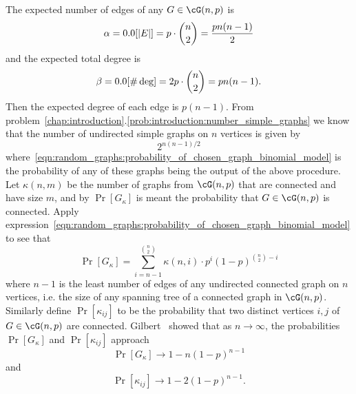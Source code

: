 The expected number of edges of any $G \in \cG(n,p)$ is
\[
\alpha
=
\E[|E|]
=
p \cdot \binom{n}{2}
=
\frac{pn(n - 1)} {2}
\]
and the expected total degree is
\[
\beta
=
\E[\#\deg]
=
2p \cdot \binom{n}{2}
=
pn(n - 1).
\]
Then the expected degree of each edge is $p(n - 1)$. From
problem~\ref{chap:introduction}.\ref{prob:introduction:number_simple_graphs}
we know that the number of undirected simple graphs on $n$ vertices is
given by
\[
2^{n(n-1) / 2}
\]
where~\eqref{eqn:random_graphs:probability_of_chosen_graph_binomial_model}
is the probability of any of these graphs being the output of the
above procedure. Let $\kappa(n,m)$ be the number of graphs from
$\cG(n,p)$ that are connected and have size $m$, and by $\Pr[G_\kappa]$
is meant the probability that $G \in \cG(n,p)$ is connected. Apply
expression~\eqref{eqn:random_graphs:probability_of_chosen_graph_binomial_model}
to see that
\[
\Pr[G_\kappa]
=
\sum_{i=n-1}^{\binom{n}{2}}
\kappa(n,i) \cdot p^i (1 - p)^{\binom{n}{2} - i}
\]
where $n - 1$ is the least number of edges of any undirected connected
graph on $n$ vertices, i.e. the size of any spanning tree of a
connected graph in $\cG(n,p)$. Similarly define $\Pr[\kappa_{ij}]$ to
be the probability that two distinct vertices $i,j$ of
$G \in \cG(n,p)$ are connected. Gilbert~\cite{Gilbert1959} showed that
as $n \to \infty$, the probabilities $\Pr[G_\kappa]$ and
$\Pr[\kappa_{ij}]$ approach
\[
\Pr[G_\kappa] \to 1 - n(1 - p)^{n-1}
\]
and
\[
\Pr[\kappa_{ij}] \to 1 - 2(1 - p)^{n-1}.
\]

